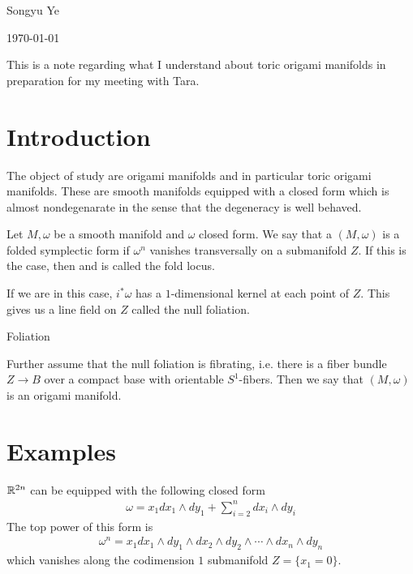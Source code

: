 \documentclass[12pt]{article}
\begin{document}
Songyu Ye

\today

\hfill

This is a note regarding what I understand about toric origami manifolds in preparation for my meeting with Tara.

\section{Introduction}

The object of study are origami manifolds and in particular toric origami manifolds. These are smooth manifolds equipped with a closed form which
is almost nondegenarate in the sense that the degeneracy is well behaved.

\begin{definition}
    Let $M,\omega$ be a smooth manifold and $\omega$ closed form. We say that a $(M,\omega)$ is 
    a folded symplectic form if $\omega^n$ vanishes transversally on a submanifold $Z$. If this is the case,
    then  and is called the fold locus.
\end{definition}

If we are in this case, $i^*\omega$ has a $1$-dimensional kernel at each point of $Z$. This gives us a line field on $Z$ 
called the null foliation.

\begin{definition}
    Foliation
\end{definition}

\begin{definition}
    Further assume that the null foliation is fibrating, i.e. there is a fiber bundle $Z\to B$ over a compact base with orientable $S^1$-fibers.
    Then we say that $(M,\omega)$ is an origami manifold.
\end{definition}

\section{Examples}

\begin{example}
    $\mathbb{R}^{2n}$ can be equipped with the following closed form \begin{align*}
        \omega = x_1 dx_1 \wedge dy_1 + \sum_{i=2}^n dx_i\wedge dy_i
    \end{align*}
    The top power of this form is \begin{align*}
        \omega^n = x_1 dx_1 \wedge dy_1 \wedge dx_2 \wedge dy_2 \wedge \cdots \wedge dx_n \wedge dy_n
    \end{align*} which vanishes along the codimension $1$ submanifold $Z = \{x_1 = 0\}$.
\end{example}
\end{document}
